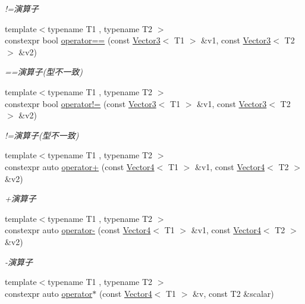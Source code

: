 \begin{DoxyCompactItemize}
\begin{DoxyCompactList}\small\item\em !=演算子 \end{DoxyCompactList}\item 
{\footnotesize template$<$typename T1 , typename T2 $>$ }\\constexpr bool \mbox{\hyperlink{namespacesaki_a487f0b513be6d4a0aecafeec28b6fc69}{operator==}} (const \mbox{\hyperlink{classsaki_1_1_vector3}{Vector3}}$<$ T1 $>$ \&v1, const \mbox{\hyperlink{classsaki_1_1_vector3}{Vector3}}$<$ T2 $>$ \&v2)
\begin{DoxyCompactList}\small\item\em ==演算子(型不一致) \end{DoxyCompactList}\item 
{\footnotesize template$<$typename T1 , typename T2 $>$ }\\constexpr bool \mbox{\hyperlink{namespacesaki_a26df5bd85b044f8556c4e258479b54f7}{operator!=}} (const \mbox{\hyperlink{classsaki_1_1_vector3}{Vector3}}$<$ T1 $>$ \&v1, const \mbox{\hyperlink{classsaki_1_1_vector3}{Vector3}}$<$ T2 $>$ \&v2)
\begin{DoxyCompactList}\small\item\em !=演算子(型不一致) \end{DoxyCompactList}\item 
{\footnotesize template$<$typename T1 , typename T2 $>$ }\\constexpr auto \mbox{\hyperlink{namespacesaki_a30ce7f379800f5d94b03c358574ba7b5}{operator+}} (const \mbox{\hyperlink{classsaki_1_1_vector4}{Vector4}}$<$ T1 $>$ \&v1, const \mbox{\hyperlink{classsaki_1_1_vector4}{Vector4}}$<$ T2 $>$ \&v2)
\begin{DoxyCompactList}\small\item\em +演算子 \end{DoxyCompactList}\item 
{\footnotesize template$<$typename T1 , typename T2 $>$ }\\constexpr auto \mbox{\hyperlink{namespacesaki_aa6f77e55cd25224c27c218790d7b1bf1}{operator-\/}} (const \mbox{\hyperlink{classsaki_1_1_vector4}{Vector4}}$<$ T1 $>$ \&v1, const \mbox{\hyperlink{classsaki_1_1_vector4}{Vector4}}$<$ T2 $>$ \&v2)
\begin{DoxyCompactList}\small\item\em -\/演算子 \end{DoxyCompactList}\item 
{\footnotesize template$<$typename T1 , typename T2 $>$ }\\constexpr auto \mbox{\hyperlink{namespacesaki_a856b63c2955b0387574c0b5e6d3c0b87}{operator$\ast$}} (const \mbox{\hyperlink{classsaki_1_1_vector4}{Vector4}}$<$ T1 $>$ \&v, const T2 \&scalar)

\end{DoxyCompactItemize}
